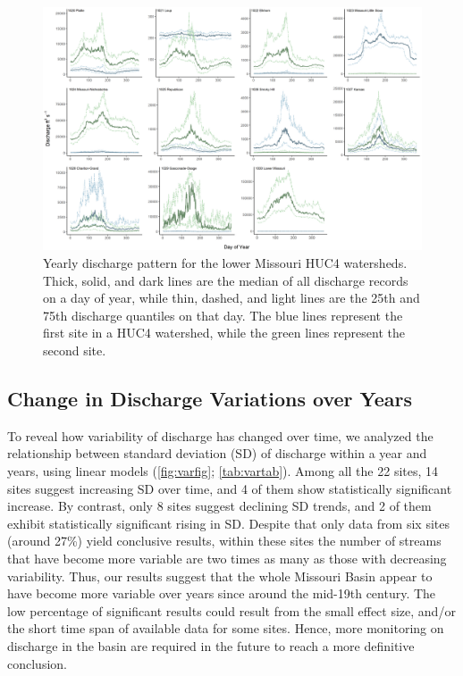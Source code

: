 \documentclass[12pt,]{article}
\makeatletter
\def\maxwidth{\ifdim\Gin@nat@width>\linewidth\linewidth\else\Gin@nat@width\fi}
\makeatother
\begin{document}
\begin{figure}[H]
\includegraphics[width=\maxwidth]{../Figures/discharge} \caption{\label{fig:dispattern}Yearly discharge pattern for the lower Missouri HUC4 watersheds. Thick, solid, and dark lines are the median of all discharge records on a day of year, while thin, dashed, and light lines are the 25th and 75th discharge quantiles on that day. The blue lines represent the first site in a HUC4 watershed, while the green lines represent the second site.}\label{fig:dispattern}
\end{figure}

\hypertarget{change-in-discharge-variations-over-years}{%
\subsection{Change in Discharge Variations over
Years}\label{change-in-discharge-variations-over-years}}

To reveal how variability of discharge has changed over time, we
analyzed the relationship between standard deviation (SD) of discharge
within a year and years, using linear models (\autoref{fig:varfig};
\autoref{tab:vartab}). Among all the 22 sites, 14 sites suggest
increasing SD over time, and 4 of them show statistically significant
increase. By contrast, only 8 sites suggest declining SD trends, and 2
of them exhibit statistically significant rising in SD. Despite that
only data from six sites (around 27\%) yield conclusive results, within
these sites the number of streams that have become more variable are two
times as many as those with decreasing variability. Thus, our results
suggest that the whole Missouri Basin appear to have become more
variable over years since around the mid-19th century. The low
percentage of significant results could result from the small effect
size, and/or the short time span of available data for some sites.
Hence, more monitoring on discharge in the basin are required in the
future to reach a more definitive conclusion.
\end{document}
